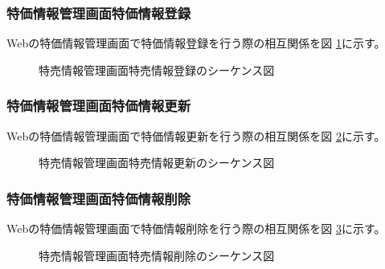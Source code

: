 \documentclass[a4j]{jarticle}
\begin{document}
  	\subsubsection{特価情報管理画面特価情報登録}
  	Webの特価情報管理画面で特価情報登録を行う際の相互関係を図 \ref{tab:oonishi23}に示す。
  	\begin{figure}[H]
  	\begin{center}
  	\caption{特売情報管理画面特売情報登録のシーケンス図}
  	\label{tab:oonishi23}
  	\end{center}
  	\end{figure}
  	\subsubsection{特価情報管理画面特価情報更新}
  	Webの特価情報管理画面で特価情報更新を行う際の相互関係を図 \ref{tab:oonishi24}に示す。
  	\begin{figure}[H]
  	\begin{center}
  	\caption{特売情報管理画面特売情報更新のシーケンス図}
  	\label{tab:oonishi24}
  	\end{center}
  	\end{figure}
  	\subsubsection{特価情報管理画面特価情報削除}
  	Webの特価情報管理画面で特価情報削除を行う際の相互関係を図 \ref{tab:oonishi25}に示す。
  	\begin{figure}[H]
  	\begin{center}
  	\caption{特売情報管理画面特売情報削除のシーケンス図}
  	\label{tab:oonishi25}
  	\end{center}
  	\end{figure}
\end{document}
